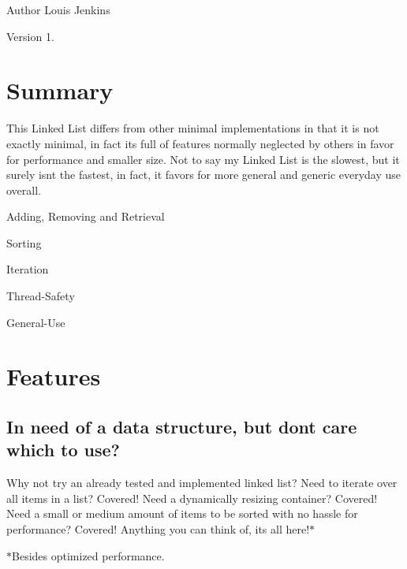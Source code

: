 \begin{DoxyAuthor}{Author}
Louis Jenkins 
\end{DoxyAuthor}
\begin{DoxyVersion}{Version}
1.
\end{DoxyVersion}
\hypertarget{index_list_summary}{}\section{Summary}\label{index_list_summary}
This Linked List differs from other minimal implementations in that it is not exactly minimal, in fact it\textquotesingle{}s full of features normally neglected by others in favor for performance and smaller size. Not to say my Linked List is the slowest, but it surely isn\textquotesingle{}t the fastest, in fact, it favors for more general and generic everyday use overall.


\begin{DoxyItemize}
\item Adding, Removing and Retrieval
\item Sorting
\item Iteration
\item Thread-\/\+Safety
\item General-\/\+Use
\end{DoxyItemize}\hypertarget{index_list_features}{}\section{Features}\label{index_list_features}
\hypertarget{index_general_use}{}\subsection{In need of a data structure, but don\textquotesingle{}t care which to use?}\label{index_general_use}
Why not try an already tested and implemented linked list? Need to iterate over all items in a list? Covered! Need a dynamically resizing container? Covered! Need a small or medium amount of items to be sorted with no hassle for performance? Covered! Anything you can think of, it\textquotesingle{}s all here!$\ast$

$\ast$\+Besides optimized performance. 